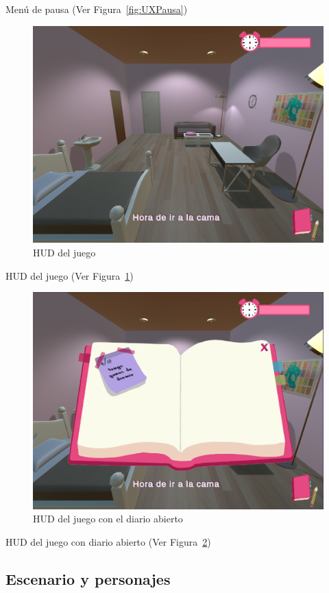 \documentclass[12pt, a4paper,twoside,titlepage]{book}
\begin{document}
Menú de pausa (Ver Figura~\ref{fig:UXPausa})

\begin{figure}
	\centering
	\includegraphics[width=.8\linewidth]{TGF/Artes/UX basic.png}
	\caption{HUD del juego}
	\label{fig:UXHUD}
\end{figure}

HUD del juego (Ver Figura~\ref{fig:UXHUD})


\begin{figure}
	\centering
	\includegraphics[width=.8\linewidth]{TGF/Artes/UX diario abierto.png}
	\caption{HUD del juego con el diario abierto}
	\label{fig:UXHUD2}
\end{figure}

HUD del juego con diario abierto (Ver Figura~\ref{fig:UXHUD2})





\subsection{Escenario y personajes}
\end{document}
